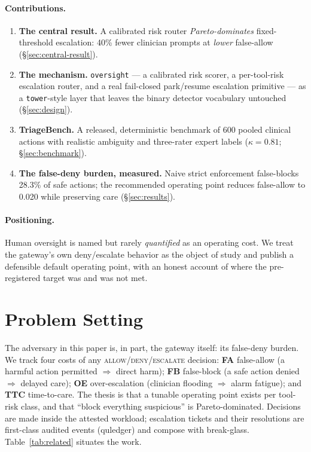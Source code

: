 \documentclass[11pt]{article}
\providecommand{\NumPrompts}{600}
\providecommand{\PolicyFalseBlock}{28.3\%}
\providecommand{\VolReduction}{40\%}
\providecommand{\FaCal}{0.020}
\providecommand{\Kappa}{0.81}
\begin{document}
\paragraph{Contributions.}
\begin{enumerate}
  \item \textbf{The central result.} A calibrated risk router \emph{Pareto-dominates}
  fixed-threshold escalation: \VolReduction{} fewer clinician prompts at \emph{lower}
  false-allow (\S\ref{sec:central-result}).
  \item \textbf{The mechanism.} \texttt{oversight} --- a calibrated risk scorer, a
  per-tool-risk escalation router, and a real fail-closed park/resume escalation
  primitive --- as a \texttt{tower}-style layer that leaves the binary detector
  vocabulary untouched (\S\ref{sec:design}).
  \item \textbf{TriageBench.} A released, deterministic benchmark of \NumPrompts{}
  pooled clinical actions with realistic ambiguity and three-rater expert labels
  ($\kappa=\Kappa$; \S\ref{sec:benchmark}).
  \item \textbf{The false-deny burden, measured.} Naive strict enforcement
  false-blocks \PolicyFalseBlock{} of safe actions; the recommended operating point
  reduces false-allow to \FaCal{} while preserving care (\S\ref{sec:results}).
\end{enumerate}

\paragraph{Positioning.} Human oversight is named but rarely \emph{quantified} as an
operating cost. We treat the gateway's own deny/escalate behavior as the object of
study and publish a defensible default operating point, with an honest account of
where the pre-registered target was and was not met.

\section{Problem Setting}
The adversary in this paper is, in part, the gateway itself: its false-deny burden.
We track four costs of any \textsc{allow}/\textsc{deny}/\textsc{escalate} decision:
\textbf{FA} false-allow (a harmful action permitted $\Rightarrow$ direct harm);
\textbf{FB} false-block (a safe action denied $\Rightarrow$ delayed care);
\textbf{OE} over-escalation (clinician flooding $\Rightarrow$ alarm fatigue); and
\textbf{TTC} time-to-care. The thesis is that a tunable operating point exists per
tool-risk class, and that ``block everything suspicious'' is Pareto-dominated.
Decisions are made inside the attested workload; escalation tickets and their
resolutions are first-class audited events (quledger) and compose with break-glass.
Table~\ref{tab:related} situates the work.
\end{document}

